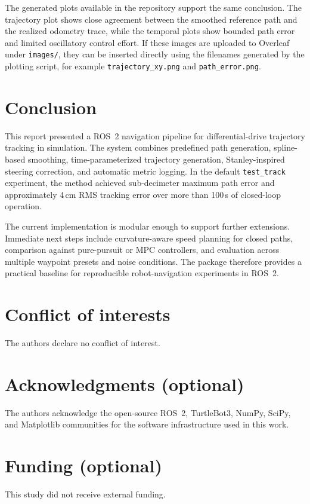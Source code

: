 \documentclass[12pt,a4paper]{cibb}
\begin{document}
The generated plots available in the repository support the same conclusion. The trajectory plot shows close agreement between the smoothed reference path and the realized odometry trace, while the temporal plots show bounded path error and limited oscillatory control effort. If these images are uploaded to Overleaf under \texttt{images/}, they can be inserted directly using the filenames generated by the plotting script, for example \texttt{trajectory\_xy.png} and \texttt{path\_error.png}.

\section{Conclusion}
\label{sec:CONCLUSIONS}

This report presented a ROS~2 navigation pipeline for differential-drive trajectory tracking in simulation. The system combines predefined path generation, spline-based smoothing, time-parameterized trajectory generation, Stanley-inspired steering correction, and automatic metric logging. In the default \texttt{test\_track} experiment, the method achieved sub-decimeter maximum path error and approximately 4\,cm RMS tracking error over more than 100\,s of closed-loop operation.

The current implementation is modular enough to support further extensions. Immediate next steps include curvature-aware speed planning for closed paths, comparison against pure-pursuit or MPC controllers, and evaluation across multiple waypoint presets and noise conditions. The package therefore provides a practical baseline for reproducible robot-navigation experiments in ROS~2.

\section*{Conflict of interests}
\label{sec:CONFLICT-OF-INTERESTS}
The authors declare no conflict of interest.

\section*{Acknowledgments (optional)}
\label{sec:ACKNOWLEDGMENTS}
The authors acknowledge the open-source ROS~2, TurtleBot3, NumPy, SciPy, and Matplotlib communities for the software infrastructure used in this work.

\section*{Funding (optional)}
\label{sec:FUNDING}
This study did not receive external funding.
\end{document}
